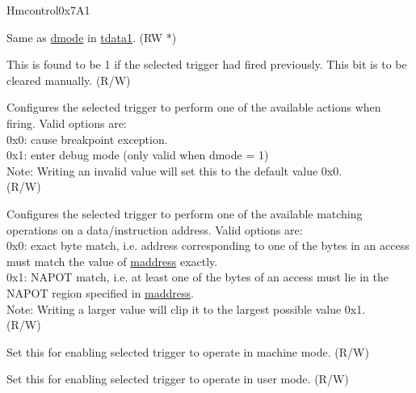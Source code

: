 \begin{register}{H}{mcontrol}{0x7A1}\label{regdesc:MCONTROL}
%
%
%
%
%
%
%
%
%
%
%
%
%
%
\regnewline%
\begin{regdesc}\begin{reglist}
\label{fielddesc:MCONTROLDMODE}\item [dmode] Same as \hyperref[fielddesc:TDATA1DMODE]{dmode} in \hyperref[regdesc:TDATA1]{tdata1}. (RW *)
\label{fielddesc:MCONTROLHIT}\item [hit] This is found to be 1 if the selected trigger had fired previously. This bit is to be cleared manually. (R/W) 
\label{fielddesc:MCONTROLACTION}\item [action] Configures the selected trigger to perform one of the available actions when firing. Valid options are:\\
0x0: cause breakpoint exception.\\
0x1: enter debug mode (only valid when dmode = 1)\\
Note: Writing an invalid value will set this to the default value 0x0.\\
(R/W)
\label{fielddesc:MCONTROLMATCH}\item [match] Configures the selected trigger to perform one of the available matching operations on a data/instruction address. Valid options are:\\
0x0: exact byte match, i.e. address corresponding to one of the bytes in an access must match the value of \hyperref[regdesc:MADDRESS]{maddress} exactly.\\
0x1: NAPOT match, i.e. at least one of the bytes of an access must lie in the NAPOT region specified in \hyperref[regdesc:MADDRESS]{maddress}.\\
Note: Writing a larger value will clip it to the largest possible value 0x1.\\
(R/W)
\label{fielddesc:MCONTROLM}\item [m] Set this for enabling selected trigger to operate in machine mode. (R/W)
\label{fielddesc:MCONTROLU}\item [u] Set this for enabling selected trigger to operate in user mode. (R/W)

\end{reglist}
\end{regdesc}
\end{register}
